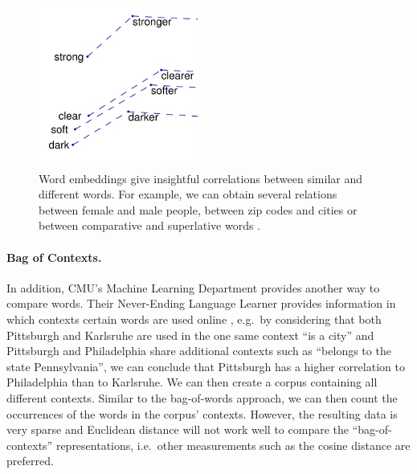 \begin{figure}[h]
\begin{minipage}{.3\textwidth}
\end{minipage}
\begin{minipage}{.3\textwidth}
  \centering
  \includegraphics[width=\linewidth]{images/glove_cs}
\end{minipage}
\caption{Word embeddings give insightful correlations between similar and different words. For example, we can obtain several relations between female and male people, between zip codes and cities or between comparative and superlative words \cite{pennington2014glove}.}
\label{fig:glove}
\end{figure}

\paragraph{Bag of Contexts.} In addition, CMU's Machine Learning Department provides another way to compare words. Their Never-Ending Language Learner provides information in which contexts certain words are used online \cite{nell_pairs}, e.g.\ by considering that both Pittsburgh and Karlsruhe are used in the one same context ``is a city'' and Pittsburgh and Philadelphia share additional contexts such as ``belongs to the state Pennsylvania'', we can conclude that Pittsburgh has a higher correlation to Philadelphia than to Karlsruhe. We can then create a corpus containing all different contexts. Similar to the bag-of-words approach, we can then count the occurrences of the words in the corpus' contexts. However, the resulting data is very sparse and Euclidean distance will not work well to compare the ``bag-of-contexts'' representations, i.e.\ other measurements such as the cosine distance are preferred.

